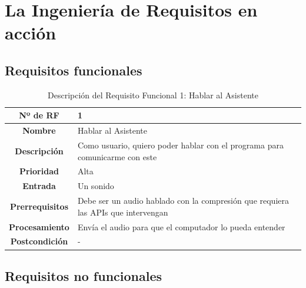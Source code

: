
\section{La Ingeniería de Requisitos en acción}

\subsection{Requisitos funcionales}

\begin{table}[H]
	\centering
	\begin{tabularx}{\textwidth}{|c|X|} 
		\hline
		\textbf{Nº de RF }          &  1 \\ 
		\hline
		\textbf{Nombre}         &  Hablar al Asistente \\ 
		\hline
		\textbf{Descripción}    &  Como usuario, quiero poder hablar con el programa para comunicarme con este \\ 
		\hline
		\textbf{Prioridad}      &  Alta  \\ 
		\hline
		\textbf{Entrada}        & Un sonido  \\ 
		\hline
		\textbf{Prerrequisitos} & Debe ser un audio hablado con la compresión que requiera las APIs que intervengan  \\ 
		\hline
		\textbf{Procesamiento}  &  Envía el audio para que el computador lo pueda entender \\ 
		\hline
		\textbf{Postcondición}  &  - \\
		\hline
	\end{tabularx}
	\caption{Descripción del Requisito Funcional 1: Hablar al Asistente}
\end{table}
\subsection{Requisitos no funcionales}